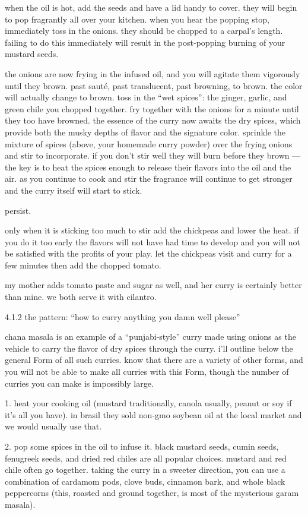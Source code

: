 when the oil is hot, add the seeds and have a lid handy to cover. they will begin to pop fragrantly all over your kitchen. when you hear the popping stop, immediately toss in the onions. they should be chopped to a carpal's length. failing to do this immediately will result in the post-popping burning of your mustard seeds.

the onions are now frying in the infused oil, and you will agitate them vigorously until they brown. past saut\'{e}, past translucent, past browning, to brown. the color will actually change to brown. toss in the ``wet spices'': the ginger, garlic, and green chile you chopped together. fry together with the onions for a minute until they too have browned. the essence of the curry now awaits the dry spices, which provide both the musky depths of flavor and the signature color. sprinkle the mixture of spices (above, your homemade curry powder) over the frying onions and stir to incorporate. if you don't stir well they will burn before they brown --- the key is to heat the spices enough to release their flavors into the oil and the air. as you continue to cook and stir the fragrance will continue to get stronger and the curry itself will start to stick.

persist.

only when it is sticking too much to stir add the chickpeas and lower the heat. if you do it too early the flavors will not have had time to develop and you will not be satisfied with the profits of your play. let the chickpeas visit and curry for a few minutes then add the chopped tomato. 

my mother adds tomato paste and sugar as well, and her curry is certainly better than mine. we both serve it with cilantro.


4.1.2  the pattern: ``how to curry anything you damn well please''

chana masala is an example of a ``punjabi-style'' curry made using onions as the vehicle to carry the flavor of dry spices through the curry. i'll outline below the general Form of all such curries. know that there are a variety of other forms, and you will not be able to make all curries with this Form, though the number of curries you can make is impossibly large.

1. heat your cooking oil (mustard traditionally, canola usually, peanut or soy if it's all you have). in brasil they sold non-gmo soybean oil at the local market and we would usually use that.

2. pop some spices in the oil to infuse it.
	black mustard seeds, cumin seeds, fenugreek seeds, and dried red chiles are all popular choices. mustard and red chile often go together.
	taking the curry in a sweeter direction, you can use a combination of cardamom pods, clove buds, cinnamon bark, and whole black peppercorns (this, roasted and ground together, is most of the mysterious garam masala).

